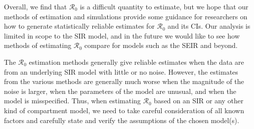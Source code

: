 \documentclass[12pt]{article}
\newcommand{\rr}{\ensuremath{\mathcal{R}_0}}
\begin{document}
Overall, we find that $\rr$ is a difficult quantity to estimate, but we hope that our methods of estimation and simulations provide some guidance for researchers on how to generate statistically reliable estimates for $\rr$ and its CIs.  Our analysis is limited in scope to the SIR model, and in the future we would like to see how methods of estimating $\rr$ compare for models such as the SEIR and beyond.







The $\rr$ estimation methods generally give reliable estimates when the data are from an underlying SIR model with little or no noise. However, the estimates from the various methods are generally much worse when the magnitude of the noise is larger, when the parameters of the model are unusual, and when the model is misspecified.  Thus, when estimating $\rr$ based on an SIR or any other kind of compartment model, we need to take careful consideration of all known factors and carefully state and verify the assumptions of the chosen model(s).


\pagebreak




\appendix
\end{document}
